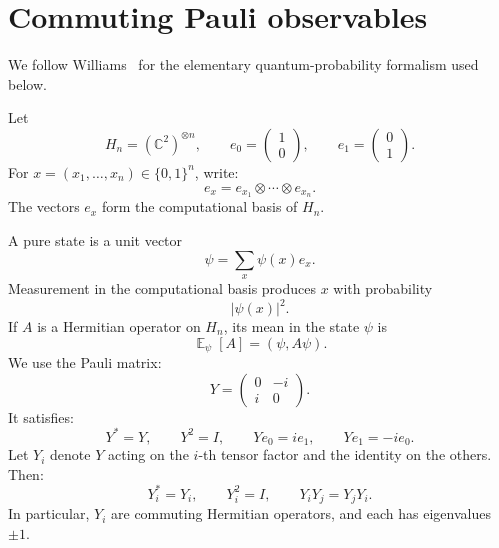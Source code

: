 \documentclass[12pt,reqno]{amsart}
\numberwithin{equation}{section}
\DeclareMathOperator{\E}{\mathbb{E}}
\begin{document}
\section{Commuting Pauli observables}\label{quantum}
We follow Williams~\cite[Chapter~10]{Williams} 
for the elementary 
quantum-probability formalism used below.
\smallskip%

Let 
\[ 
H_n=(\mathbb C^2)^{\otimes n}, \qquad e_0= \begin{pmatrix}1\\0\end{pmatrix}, \qquad e_1= \begin{pmatrix}0\\1\end{pmatrix}. 
\] 
For \(x=(x_1,\ldots,x_n)\in\{0,1\}^n\), write: 
\[ 
e_x=e_{x_1}\otimes\cdots\otimes e_{x_n}. 
\] 
The vectors \(e_x\) 
form the computational basis of \(H_n\).
\smallskip%

A pure state is a unit vector 
\[ 
\psi=\sum_x\psi(x)e_x. 
\] 
Measurement in the computational basis produces \(x\) with probability 
\[ 
|\psi(x)|^2. 
\] 
If \(A\) is a Hermitian operator on \(H_n\), 
its mean in the state \(\psi\) is 
\[ 
\E_\psi[A]=(\psi,A\psi). 
\]
We use the Pauli matrix: 
\[ 
Y= \begin{pmatrix} 0&-i\\ i&0 \end{pmatrix}.
\] 
It satisfies:
\[ 
Y^*=Y, \qquad Y^2=I, \qquad Ye_0=ie_1, \qquad Ye_1=-ie_0. 
\]
Let \(Y_i\) denote \(Y\) acting on the \(i\)-th tensor factor and the identity on the others. 
Then: 
\[ 
Y_i^*=Y_i, \qquad Y_i^2=I, \qquad Y_iY_j=Y_jY_i. 
\]
In particular, \(Y_i\) are commuting Hermitian operators, and each has eigenvalues \(\pm1\).
\smallskip%
\end{document}
